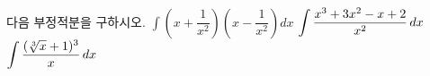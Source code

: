 다음 부정적분을 구하시오.
 $\displaystyle\int \left(x+\dfrac{1}{x^2}\right)\left(x-\dfrac{1}{x^2}\right)dx$
 $\displaystyle\int \dfrac{x^3+3x^2-x+2}{x^2}\mkern3mu dx$
 $\displaystyle\int \dfrac{(\sqrt[3]{x}+1)^3}{x}\mkern3mu dx$
